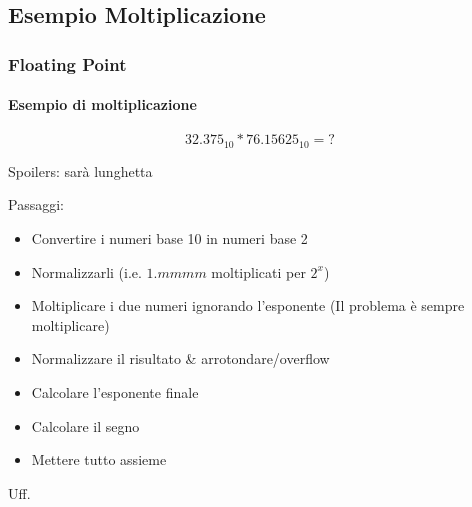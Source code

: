 \documentclass{beamer}
\begin{document}
	\subsection{Esempio Moltiplicazione}
  \begin{frame}
    \frametitle{Floating Point}
    \framesubtitle{Esempio di moltiplicazione}
    $$32.375_{10} * 76.15625_{10} = ?$$
		\begin{center}
			Spoilers: sarà lunghetta
		\end{center}		    
    \vspace{1em}
    Passaggi:
    \begin{itemize}
    		\item Convertire i numeri base 10 in numeri base 2
    		\item Normalizzarli (i.e. $1.mmmm$ moltiplicati per $2^{x}$)
    		\item Moltiplicare i due numeri ignorando l'esponente (Il problema è sempre moltiplicare)
    		\item Normalizzare il risultato \& arrotondare/overflow
    		\item Calcolare l'esponente finale
    		\item Calcolare il segno
    		\item Mettere tutto assieme
    \end{itemize}
    Uff.
  \end{frame} 
  
\end{document}
